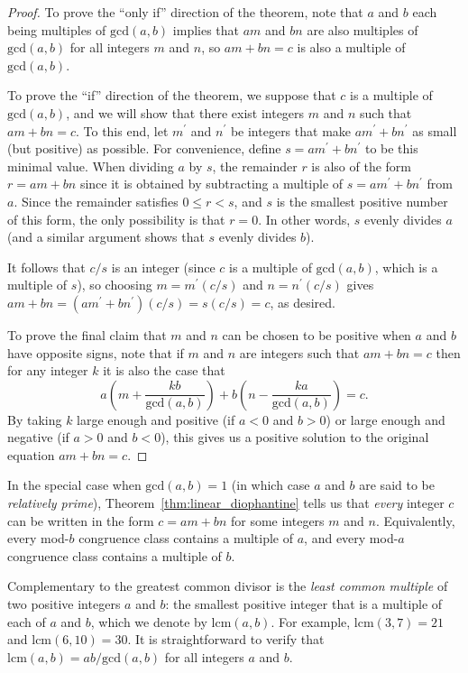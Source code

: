 \begin{proof}
	To prove the ``only if'' direction of the theorem, note that $a$ and $b$ each being multiples of $\mathrm{gcd}(a,b)$ implies that $am$ and $bn$ are also multiples of $\mathrm{gcd}(a,b)$ for all integers $m$ and $n$, so $am + bn = c$ is also a multiple of $\mathrm{gcd}(a,b)$.
	
	To prove the ``if'' direction of the theorem, we suppose that $c$ is a multiple of $\mathrm{gcd}(a,b)$, and we will show that there exist integers $m$ and $n$ such that $am + bn = c$. To this end, let $m^\prime$ and $n^\prime$ be integers that make $am^\prime + bn^\prime$ as small (but positive) as possible. For convenience, define $s = am^\prime + bn^\prime$ to be this minimal value. When dividing $a$ by $s$, the remainder $r$ is also of the form $r = am + bn$ since it is obtained by subtracting a multiple of $s = am^\prime + bn^\prime$ from $a$. Since the remainder satisfies $0 \leq r < s$, and $s$ is the smallest positive number of this form, the only possibility is that $r = 0$. In other words, $s$ evenly divides $a$ (and a similar argument shows that $s$ evenly divides $b$).
	
	It follows that $c/s$ is an integer (since $c$ is a multiple of $\mathrm{gcd}(a,b)$, which is a multiple of $s$), so choosing $m = m^\prime(c/s)$ and $n = n^\prime(c/s)$ gives $am + bn = (am^\prime + bn^\prime)(c/s) = s(c/s) = c$, as desired.
	
	To prove the final claim that $m$ and $n$ can be chosen to be positive when $a$ and $b$ have opposite signs, note that if $m$ and $n$ are integers such that $am + bn = c$ then for any integer $k$ it is also the case that
	\[
		a\left(m + \frac{kb}{\mathrm{gcd}(a,b)}\right) + b\left(n - \frac{ka}{\mathrm{gcd}(a,b)}\right) = c.
	\]
	By taking $k$ large enough and positive (if $a < 0$ and $b > 0$) or large enough and negative (if $a > 0$ and $b < 0$), this gives us a positive solution to the original equation $am + bn = c$.
\end{proof}

In the special case when $\mathrm{gcd}(a,b) = 1$ (in which case $a$ and $b$ are said to be \emph{relatively prime}), Theorem~\ref{thm:linear_diophantine} tells us that \emph{every} integer $c$ can be written in the form $c = am + bn$ for some integers $m$ and $n$. Equivalently, every mod-$b$ congruence class contains a multiple of $a$, and every mod-$a$ congruence class contains a multiple of $b$.

Complementary to the greatest common divisor is the \emph{least common multiple} of two positive integers $a$ and $b$: the smallest positive integer that is a multiple of each of $a$ and $b$, which we denote by $\mathrm{lcm}(a,b)$. For example, $\mathrm{lcm}(3,7) = 21$ and $\mathrm{lcm}(6,10) = 30$. It is straightforward to verify that $\mathrm{lcm}(a,b) = ab/\mathrm{gcd}(a,b)$ for all integers $a$ and $b$.


